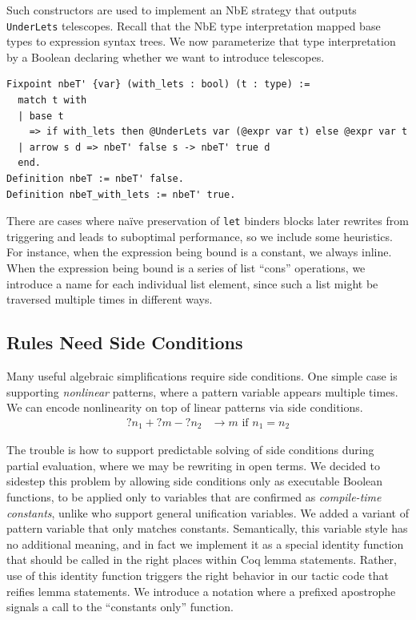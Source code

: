 Such constructors are used to implement an NbE strategy that outputs \texttt{UnderLets} telescopes.
Recall that the NbE type interpretation mapped base types to expression syntax trees.
We now parameterize that type interpretation by a Boolean declaring whether we want to introduce telescopes.

\begin{verbatim}
Fixpoint nbeT' {var} (with_lets : bool) (t : type) :=
  match t with
  | base t
    => if with_lets then @UnderLets var (@expr var t) else @expr var t
  | arrow s d => nbeT' false s -> nbeT' true d
  end.
Definition nbeT := nbeT' false.
Definition nbeT_with_lets := nbeT' true.
\end{verbatim}


There are cases where naïve preservation of \texttt{let} binders blocks later rewrites from triggering and leads to suboptimal performance, so we include some heuristics.
For instance, when the expression being bound is a constant, we always inline.
When the expression being bound is a series of list ``cons'' operations, we introduce a name for each individual list element, since such a list might be traversed multiple times in different ways.

\subsection{Rules Need Side Conditions}\label{sec:side-conditions}

Many useful algebraic simplifications require side conditions.
One simple case is supporting \emph{nonlinear} patterns, where a pattern variable appears multiple times.
We can encode nonlinearity on top of linear patterns via side conditions.
\begin{align*}
  {?n_1} + {?m} - {?n_2} & \to m\text{\ \ if\ \ }n_1 = n_2
\end{align*}

The trouble is how to support predictable solving of side conditions during partial evaluation, where we may be rewriting in open terms.
We decided to sidestep this problem by allowing side conditions only as executable Boolean functions, to be applied only to variables that are confirmed as \emph{compile-time constants}, unlike \textcite{rtac} who support general unification variables.
We added a variant of pattern variable that only matches constants.
Semantically, this variable style has no additional meaning, and in fact we implement it as a special identity function that should be called in the right places within Coq lemma statements.
Rather, use of this identity function triggers the right behavior in our tactic code that reifies lemma statements.
We introduce a notation where a prefixed apostrophe signals a call to the ``constants only'' function.


